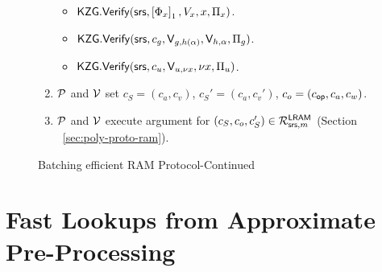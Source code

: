 \begin{figure}[t!]
\begin{mdframed}
\begin{enumerate}[leftmargin=1em, label=\arabic*.]
\begin{itemize}[leftmargin=1em]
                \item $\KZGverify(\srs, \gone{\Phi_x}, V_x, x, \Pi_x)$.
                \item $\KZGverify(\srs, c_g, \val{h(\alpha)}{g}, \val{\alpha}{h}, \Pi_g)$.
                \item $\KZGverify(\srs, c_u,\val{\nu x}{u}, \nu x, \Pi_u)$.
            \end{itemize}
            \item $\prover$ and $\verifier$ set $c_S=(c_a, c_v)$, $c_S'=(c_a, c_v')$, $c_o=(c_\op, c_a, c_w)$.
            \item $\prover$ and $\verifier$ execute argument for $(c_S, c_o, c_S')\in \CLRAM$ (Section ~\ref{sec:poly-proto-ram}).
        \end{enumerate}
    \end{mdframed}
    \caption{Batching efficient RAM Protocol-Continued}
    \label{fig:complete-listing-3}
\end{figure}





\section{Fast Lookups from Approximate Pre-Processing}\label{sec:update-protocol}














